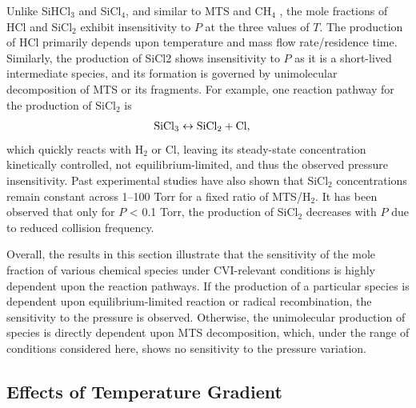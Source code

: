 \documentclass[final, letterpaper, square, comma, numbers, sort&compress]{elsarticle}
\begin{document}
Unlike SiHCl$_3$ and SiCl$_4$, and similar to MTS and CH$_4$ , the mole fractions of HCl and SiCl$_2$ exhibit insensitivity to $P$ at the three values of $T$. The production of HCl primarily depends upon temperature and mass flow rate/residence time. Similarly, the production of SiCl2 shows insensitivity to $P$ as it is a short-lived intermediate species, and its formation is governed by unimolecular decomposition of MTS or its fragments. For example, one reaction pathway for the production of SiCl$_2$ is
\begin{align*}
    \rm SiCl_3 \leftrightarrow SiCl_2 + Cl, &
\end{align*}
which quickly reacts with H$_2$ or Cl, leaving its steady-state concentration kinetically controlled, not equilibrium-limited, and thus the observed pressure insensitivity. Past experimental studies have also shown that SiCl$_2$ concentrations remain constant across 1–100 Torr for a fixed ratio of MTS/H$_2$. It has been observed that only for $P$ < 0.1 Torr, the production of SiCl$_2$ decreases with $P$ due to reduced collision frequency.

Overall, the results in this section illustrate that the sensitivity of the mole fraction of various chemical species under CVI-relevant conditions is highly dependent upon the reaction pathways. If the production of a particular species is dependent upon equilibrium-limited reaction or radical recombination, the sensitivity to the pressure is observed. Otherwise, the unimolecular production of species is directly dependent upon MTS decomposition, which, under the range of conditions considered here, shows no sensitivity to the pressure
variation.

\subsection{Effects of Temperature Gradient}
\end{document}
